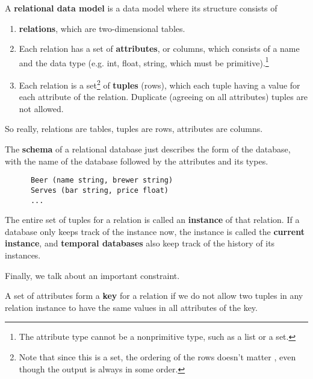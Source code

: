 \documentclass{article}
\begin{document}
  \begin{definition}
    A \textbf{relational data model} is a data model where its structure consists of 
    \begin{enumerate}
      \item \textbf{relations}, which are two-dimensional tables. 
      \item Each relation has a set of \textbf{attributes}, or columns, which consists of a name and the data type (e.g. int, float, string, which must be primitive).\footnote{The attribute type cannot be a nonprimitive type, such as a list or a set. }
      \item Each relation is a set\footnote{Note that since this is a set, the ordering of the rows doesn't matter , even though the output is always in some order.} of \textbf{tuples} (rows), which each tuple having a value for each attribute of the relation. Duplicate (agreeing on all attributes) tuples are not allowed. 
    \end{enumerate}
    So really, relations are tables, tuples are rows, attributes are columns. 
  \end{definition}

  \begin{definition}[Schema]
    The \textbf{schema} of a relational database just describes the form of the database, with the name of the database followed by the attributes and its types. 
    \begin{lstlisting}
      Beer (name string, brewer string)
      Serves (bar string, price float)
      ...
    \end{lstlisting}
  \end{definition}

  \begin{definition}[Instance]
    The entire set of tuples for a relation is called an \textbf{instance} of that relation. If a database only keeps track of the instance now, the instance is called the \textbf{current instance}, and \textbf{temporal databases} also keep track of the history of its instances. 
  \end{definition}

  Finally, we talk about an important constraint. 

  \begin{definition}[Key]
    A set of attributes form a \textbf{key} for a relation if we do not allow two tuples in any relation instance to have the same values in all attributes of the key. 
  \end{definition}
\end{document}

